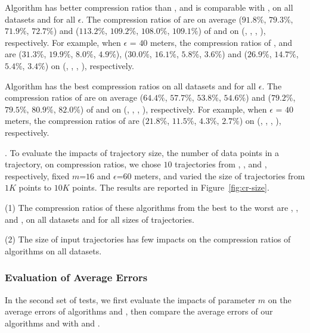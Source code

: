  Algorithm \cist has better compression ratios than \squishe, and is {comparable} with \dps, on all datasets and for all $\epsilon$.
The compression ratios of \cist are on average ($91.8\%$, $79.3\%$, $71.9\%$, {$72.7\%$}) and ($113.2\%$, $109.2\%$, $108.0\%$, $109.1\%$) of \squishe and \dps on (\truck, \sercar, \geolife, \pricar), respectively.
For example, when $\epsilon$ = $40$ meters, the compression ratios of \squishe, \cist and \dps are ($31.3\%$, $19.9\%$, $8.0\%$, $4.9\%$), ($30.0\%$, $16.1\%$, $5.8\%$, $3.6\%$) and ($26.9\%$, $14.7\%$, $5.4\%$, $3.4\%$) on (\truck, \sercar, \geolife, \pricar), respectively.

 Algorithm \cista has {the best} compression ratios on all datasets and for all $\epsilon$.
The compression ratios of \cista are on average ($64.4\%$, $57.7\%$, $53.8\%$, {$54.6\%$}) and ($79.2\%$, $79.5\%$, $80.9\%$, $82.0\%$) of \squishe and \dps on (\truck, \sercar, \geolife, \pricar), respectively.
For example, when $\epsilon$ = $40$ meters, the compression ratios of \cista are ($21.8\%$, $11.5\%$, $4.3\%$, $2.7\%$) on (\truck, \sercar, \geolife, \pricar), respectively.


.
To evaluate the impacts of trajectory size, \ie the number of data points in a trajectory, on compression ratios,
we chose {$10$} trajectories from \truck, \sercar, \geolife and \pricar, respectively,
fixed {$m$=$16$} and $\epsilon$=$60$ meters, and varied the size  of trajectories from $1K$ points to $10K$ points.
%
The results are reported in Figure~\ref{fig:cr-size}.

\ni(1) The compression ratios of these algorithms from the best to the worst are \cista, \dps, \cist and \squishe, on all datasets and for all sizes of trajectories. %

\ni(2) The size of input trajectories has few impacts on the compression ratios of \lsa algorithms on all datasets.





\subsubsection{Evaluation of Average Errors}
In the second set of tests, we first evaluate the impacts of parameter $m$ on the average errors of algorithms \cist and \cista, then compare the average errors of our algorithms \cist and \cista with \dps and \squishe.

